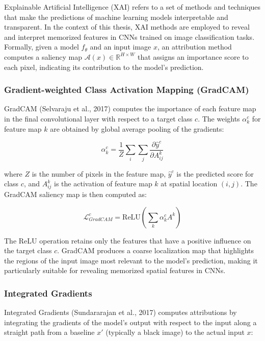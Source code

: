 
Explainable Artificial Intelligence (XAI) refers to 
a set of methods and techniques that make the 
predictions of machine learning models interpretable 
and transparent. In the context of this thesis, XAI 
methods are employed to reveal and interpret memorized 
features in CNNs trained on image classification tasks. 
Formally, given a model $f_\theta$ and an input image 
$x$, an attribution method computes a saliency map 
$\mathcal{A}(x) \in \mathbb{R}^{H \times W}$ that 
assigns an importance score to each pixel, indicating 
its contribution to the model's prediction.

\subsubsection{Gradient-weighted Class Activation 
Mapping (GradCAM)}

GradCAM (Selvaraju et al., 2017) computes the 
importance of each feature map in the final 
convolutional layer with respect to a target 
class $c$. The weights $\alpha_k^c$ for feature 
map $k$ are obtained by global average pooling 
of the gradients:

\begin{equation}
\alpha_k^c = \frac{1}{Z} \sum_{i} \sum_{j} 
\frac{\partial \hat{y}^c}{\partial A^k_{ij}}
\label{eq:gradcamweights}
\end{equation}

where $Z$ is the number of pixels in the feature 
map, $\hat{y}^c$ is the predicted score for class 
$c$, and $A^k_{ij}$ is the activation of feature 
map $k$ at spatial location $(i,j)$. The GradCAM 
saliency map is then computed as:

\begin{equation}
\mathcal{L}^c_{GradCAM} = \text{ReLU}
\left(\sum_{k} \alpha_k^c A^k\right)
\label{eq:gradcam}
\end{equation}

The ReLU operation retains only the features that 
have a positive influence on the target class $c$. 
GradCAM produces a coarse localization map that 
highlights the regions of the input image most 
relevant to the model's prediction, making it 
particularly suitable for revealing memorized 
spatial features in CNNs.

\subsubsection{Integrated Gradients}

Integrated Gradients (Sundararajan et al., 2017) 
computes attributions by integrating the gradients 
of the model's output with respect to the input 
along a straight path from a baseline $x'$ 
(typically a black image) to the actual input $x$:


